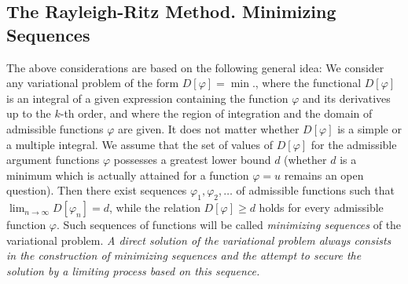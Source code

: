 \subsection{The Rayleigh-Ritz Method. Minimizing Sequences}
The above considerations are based on the following general idea: We consider any variational problem of the form $D[\varphi]=\min.$, where the functional $D[\varphi]$ is an integral of a given expression containing the function $\varphi$ and its derivatives up to the $k$-th order, and where the region of integration and the domain of admissible functions $\varphi$ are given. It does not matter whether $D[\varphi]$ is a simple or a multiple integral. We assume that the set of values of $D[\varphi]$ for the admissible argument functions $\varphi$ possesses a greatest lower bound $d$ (whether $d$ is a minimum which is actually attained for a function $\varphi=u$ remains an open question). Then there exist sequences $\varphi_1,\varphi_2,\ldots$ of admissible functions such that $\lim_{n\to\infty}D[\varphi_n]=d$, while the relation $D[\varphi]\ge d$ holds for every admissible function $\varphi$. Such sequences of functions will be called \emph{minimizing sequences} of the variational problem. \emph{A direct solution of the variational problem always consists in the construction of minimizing sequences and the attempt to secure the solution by a limiting process based on this sequence.}

